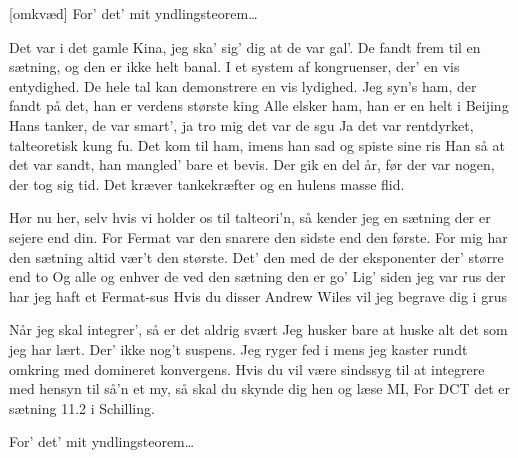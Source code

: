 \documentclass[a4paper,11pt]{article}
\begin{document}
\begin{song}
[omkvæd] For' det' mit yndlingsteorem\dots

 Det var i det gamle Kina, jeg ska' sig' dig at de var gal'.
De fandt frem til en sætning, og den er ikke helt banal.
I et system af kongruenser, der' en vis entydighed.
De hele tal kan demonstrere en vis lydighed.
Jeg syn's ham, der fandt på det, han er verdens største king
Alle elsker ham, han er en helt i Beijing
Hans tanker, de var smart', ja tro mig det var de sgu
Ja det var rentdyrket, talteoretisk kung fu.
Det kom til ham, imens han sad og spiste sine ris
Han så at det var sandt, han mangled' bare et bevis.
Der gik en del år, før der var nogen, der tog sig tid.
Det kræver tankekræfter og en hulens masse flid.

 Hør nu her, selv hvis vi holder os til talteori'n,
så kender jeg en sætning der er sejere end din.
For Fermat var den snarere den sidste end den første.
For mig har den sætning altid vær't den største.
Det' den med de der eksponenter der' større end to
Og alle og enhver de ved den sætning den er go'
Lig' siden jeg var rus der har jeg haft et Fermat-sus
Hvis du disser Andrew Wiles vil jeg begrave dig i grus

 Når jeg skal integrer',
så er det aldrig svært
Jeg husker bare at huske alt det som jeg har lært.
Der' ikke nog't suspens.
Jeg ryger fed i mens
jeg kaster rundt omkring med domineret konvergens.
Hvis du vil være sindssyg
til at integrere med hensyn til så'n et my,
så skal du skynde dig hen og læse MI,
For DCT det er sætning 11.2 i
Schilling.

 For' det' mit yndlingsteorem\dots
\end{song}
\end{document}
